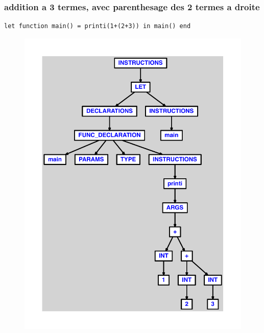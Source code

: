\documentclass{article}
\begin{document}
\subsubsection{addition a 3 termes, avec parenthesage des 2 termes a droite}
\begin{lstlisting}
let function main() = printi(1+(2+3)) in main() end
\end{lstlisting}
\newpage
\begin{figure}[H]
\centering
\includegraphics[max width=\textwidth]{ast/ast_87.pdf}
\end{figure}
\newpage
\end{document}
